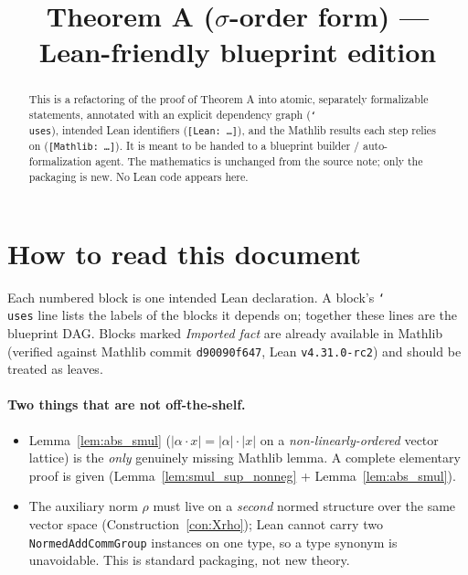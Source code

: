\documentclass[11pt]{article}
\title{Theorem A ($\sigma$-order form) --- Lean-friendly blueprint edition}
\author{}
\date{}
\newcommand{\uses}[1]{\par\smallskip{\normalfont\scriptsize$\vdash$\ \textsf{Uses:} \texttt{\detokenize{#1}}}}
\theoremstyle{definition}
\theoremstyle{plain}
\theoremstyle{remark}
\newcommand{\abs}[1]{\lvert #1\rvert}
\newcommand{\act}{\cdot}
\begin{document}
\maketitle

\begin{abstract}
This is a refactoring of the proof of Theorem A into atomic, separately
formalizable statements, annotated with an explicit dependency graph
(\texttt{\char`\\uses}), intended Lean identifiers (\texttt{[Lean: \dots]}),
and the Mathlib results each step relies on (\texttt{[Mathlib: \dots]}).
It is meant to be handed to a blueprint builder / auto-formalization agent.
The mathematics is unchanged from the source note; only the packaging is new.
No Lean code appears here.
\end{abstract}

\tableofcontents

\section{How to read this document}

Each numbered block is one intended Lean declaration. A block's
\texttt{\char`\\uses} line lists the labels of the blocks it depends on; together
these lines are the blueprint DAG. Blocks marked \emph{Imported fact} are
already available in Mathlib (verified against Mathlib commit
\texttt{d90090f647}, Lean \texttt{v4.31.0-rc2}) and should be treated as leaves.

\paragraph{Two things that are not off-the-shelf.}
\begin{itemize}[leftmargin=1.5em]
\item Lemma~\ref{lem:abs_smul} (\(\abs{\alpha \act x}=\abs{\alpha}\act\abs{x}\) on a
      \emph{non-linearly-ordered} vector lattice) is the \emph{only} genuinely
      missing Mathlib lemma. A complete elementary proof is given
      (Lemma~\ref{lem:smul_sup_nonneg} + Lemma~\ref{lem:abs_smul}).
\item The auxiliary norm \(\rho\) must live on a \emph{second} normed structure
      over the same vector space (Construction~\ref{con:Xrho}); Lean cannot carry
      two \texttt{NormedAddCommGroup} instances on one type, so a type synonym is
      unavoidable. This is standard packaging, not new theory.
\end{itemize}
\end{document}
